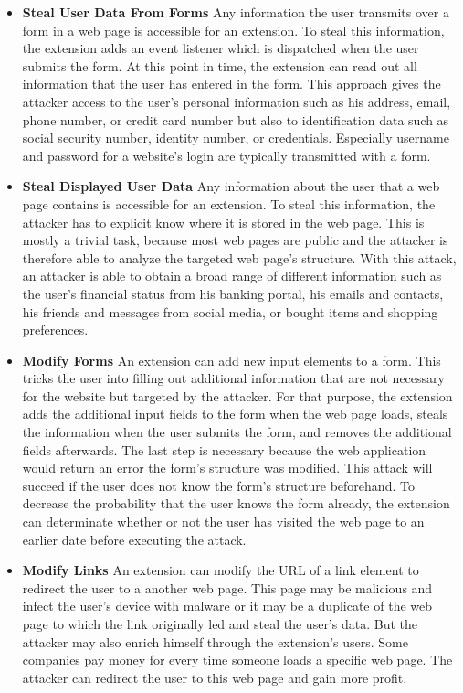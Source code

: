 	\begin{itemize}
		\item \textbf{Steal User Data From Forms} Any information the user transmits over a form in a web page is accessible for an extension. To steal this information, the extension adds an event listener which is dispatched when the user submits the form. At this point in time, the extension can read out all information that the user has entered in the form. This approach gives the attacker access to the user's personal information such as his address, email, phone number, or credit card number but also to identification data such as social security number, identity number, or credentials. Especially username and password for a website's login are typically transmitted with a form.
		
		\item \textbf{Steal Displayed User Data} Any information about the user that a web page contains is accessible for an extension. To steal this information, the attacker has to explicit know where it is stored in the web page. This is mostly a trivial task, because most web pages are public and the attacker is therefore able to analyze the targeted web page's structure. With this attack, an attacker is able to obtain a broad range of different information such as the user's financial status from his banking portal, his emails and contacts, his friends and messages from social media, or bought items and shopping preferences.
		
		\item \textbf{Modify Forms} An extension can add new input elements to a form. This tricks the user into filling out additional information that are not necessary for the website but targeted by the attacker. For that purpose, the extension adds the additional input fields to the form when the web page loads, steals the information when the user submits the form, and removes the additional fields afterwards. The last step is necessary because the web application would return an error the form's structure was modified. This attack will succeed if the user does not know the form's structure beforehand. To decrease the probability that the user knows the form already, the extension can determinate whether or not the user has visited the web page to an earlier date before executing the attack. 
		
		\item \textbf{Modify Links} An extension can modify the URL of a link element to redirect the user to a another web page. This page may be malicious and infect the user's device with malware or it may be a duplicate of the web page to which the link originally led and steal the user's data. But the attacker may also enrich himself through the extension's users. Some companies pay money for every time someone loads a specific web page. The attacker can redirect the user to this web page and gain more profit.
		

\end{itemize}
